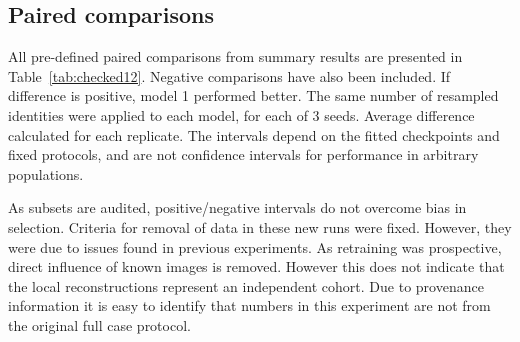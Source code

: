 \documentclass[10pt,lettersize,journal]{IEEEtran}
\begin{document}
\subsection{Paired comparisons}
All pre-defined paired comparisons from summary results are presented in Table~\ref{tab:checked12}. Negative comparisons have also been included. If difference is positive, model 1 performed better. The same number of resampled identities were applied to each model, for each of 3 seeds. Average difference calculated for each replicate. The intervals depend on the fitted checkpoints and fixed protocols, and are not confidence intervals for performance in arbitrary populations.\par
\begin{table}[t]\centering
\caption{Average differences in AUC values. 95\% sensitivity intervals from 2 endpoint identity resamplings. 1000 replicates. (G-F: Gate - Fixed fusion; W-B: Whole LoRA - Frozen base).}
\label{tab:checked12}
\footnotesize\setlength{\tabcolsep}{2pt}
\ifdim\wd\uploadedtablebox>\columnwidth\resizebox{\columnwidth}{!}{\usebox{\uploadedtablebox}}\else\usebox{\uploadedtablebox}\fi
\end{table}
As subsets are audited, positive/negative intervals do not overcome bias in selection. Criteria for removal of data in these new runs were fixed. However, they were due to issues found in previous experiments. As retraining was prospective, direct influence of known images is removed. However this does not indicate that the local reconstructions represent an independent cohort. Due to provenance information it is easy to identify that numbers in this experiment are not from the original full case protocol.\par
\end{document}
